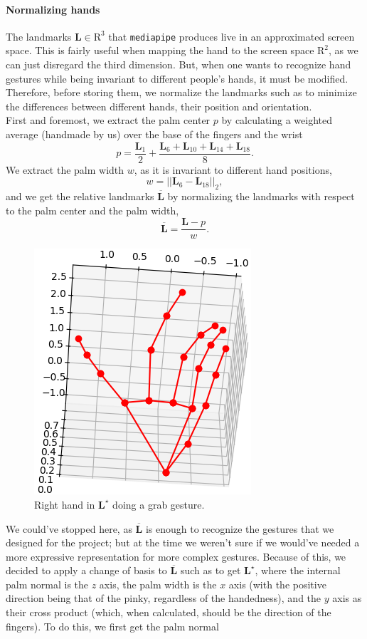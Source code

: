 \documentclass[a4paper, 11pt, twocolumn]{IEEEtran}
\begin{document}
    \paragraph*{Normalizing hands} The landmarks $\mathbf{L}\in\mathrm{R}^3$ that \texttt{mediapipe} produces live in an approximated screen space. This is fairly useful when mapping the hand to the screen space $\mathrm{R}^2$, as we can just disregard the third dimension. But, when one wants to recognize hand gestures while being invariant to different people's hands, it must be modified. Therefore, before storing them, we normalize the landmarks such as to minimize the differences between different hands, their position and orientation.\\
    First and foremost, we extract the palm center $p$ by calculating a weighted average (handmade by us) over the base of the fingers and the wrist
    \begin{equation}
        p = \frac{\mathbf{L}_1}{2} + \frac{\mathbf{L}_6 + \mathbf{L}_{10} + \mathbf{L}_{14} + \mathbf{L}_{18}}{8}.
    \end{equation}
    We extract the palm width $w$, as it is invariant to different hand positions,
    \begin{equation}
        w = ||\mathbf{L}_6 - \mathbf{L}_{18}||_2,
    \end{equation}
    and we get the relative landmarks $\overline{\mathbf{L}}$ by normalizing the landmarks with respect to the palm center and the palm width,
    \begin{equation}
        \overline{\mathbf{L}} = \frac{\mathbf{L} - p}{w}.
    \end{equation}
    \begin{figure}
        \centering
        \includegraphics[width=.33\textwidth]{images/norm_hand.png}
        \caption{Right hand in $\mathbf{L}^\star$ doing a grab gesture.}
        \label{fig:norm_hand}
    \end{figure}
    We could've stopped here, as $\overline{\mathbf{L}}$ is enough to recognize the gestures that we designed for the project; but at the time we weren't sure if we would've needed a more expressive representation for more complex gestures. Because of this, we decided to apply a change of basis to $\overline{\mathbf{L}}$ such as to get $\mathbf{L}^\star$, where the internal palm normal is the $z$ axis, the palm width is the $x$ axis (with the positive direction being that of the pinky, regardless of the handedness), and the $y$ axis as their cross product (which, when calculated, should be the direction of the fingers). To do this, we first get the palm normal
\end{document}
